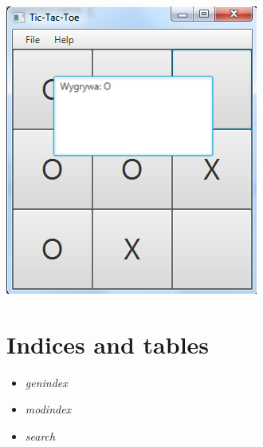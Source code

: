 \documentclass[letterpaper,10pt,english]{sphinxmanual}
\begin{document}
{\hfill\includegraphics{ttt.png}\hfill}


\chapter{Indices and tables}
\label{index:indices-and-tables}\begin{itemize}
\item {} 
\emph{genindex}

\item {} 
\emph{modindex}

\item {} 
\emph{search}

\end{itemize}



\renewcommand{\indexname}{Index}
\printindex
\end{document}
